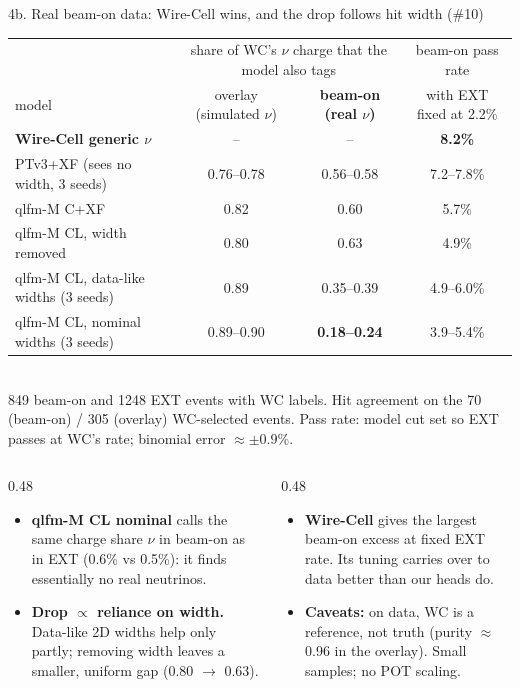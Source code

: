 \documentclass[aspectratio=169,10pt]{beamer}
\newcommand{\good}[1]{{\color{green!45!black}\textbf{#1}}}
\newcommand{\bad}[1]{{\color{red!70!black}\textbf{#1}}}
\newcommand{\iss}[1]{{\color{blue!60!black}\##1}}
\begin{document}
\begin{frame}{4b. Real beam-on data: Wire-Cell wins, and the drop follows hit width (\iss{10})}
  \footnotesize
  \centering
  \scriptsize
  \begin{tabular}{lccc}
    \toprule
    & \multicolumn{2}{c}{share of WC's $\nu$ charge that the model also tags} & beam-on pass rate \\
    model & overlay (simulated $\nu$) & \textbf{beam-on (real $\nu$)} & with EXT fixed at 2.2\% \\
    \midrule
    \textbf{Wire-Cell generic $\nu$} & -- & -- & \good{8.2\%} \\
    PTv3+XF (sees no width, 3 seeds) & 0.76--0.78 & 0.56--0.58 & 7.2--7.8\% \\
    qlfm-M C+XF & 0.82 & 0.60 & 5.7\% \\
    qlfm-M CL, width removed & 0.80 & 0.63 & 4.9\% \\
    qlfm-M CL, data-like widths (3 seeds) & 0.89 & 0.35--0.39 & 4.9--6.0\% \\
    qlfm-M CL, nominal widths (3 seeds) & 0.89--0.90 & \bad{0.18--0.24} & 3.9--5.4\% \\
    \bottomrule
  \end{tabular}\\[1pt]
  {\tiny 849 beam-on and 1248 EXT events with WC labels. Hit agreement on the 70 (beam-on) / 305 (overlay) WC-selected events. Pass rate: model cut set so EXT passes at WC's rate; binomial error $\approx\pm0.9\%$.}
  \vspace{6pt}
  \raggedright\footnotesize
  \begin{columns}[T]
    \begin{column}{0.48\textwidth}
      \begin{itemize}
        \item \textbf{qlfm-M CL nominal} calls the same charge share $\nu$ in beam-on as in EXT (0.6\% vs 0.5\%): it finds essentially no real neutrinos.
        \item \textbf{Drop $\propto$ reliance on width.} Data-like 2D widths help only partly; removing width leaves a smaller, uniform gap (0.80 $\rightarrow$ 0.63).
      \end{itemize}
    \end{column}
    \begin{column}{0.48\textwidth}
      \begin{itemize}
        \item \textbf{Wire-Cell} gives the largest beam-on excess at fixed EXT rate. Its tuning carries over to data better than our heads do.
        \item \textbf{Caveats:} on data, WC is a reference, not truth (purity $\approx$0.96 in the overlay). Small samples; no POT scaling.
      \end{itemize}
    \end{column}
  \end{columns}
\end{frame}
\end{document}
